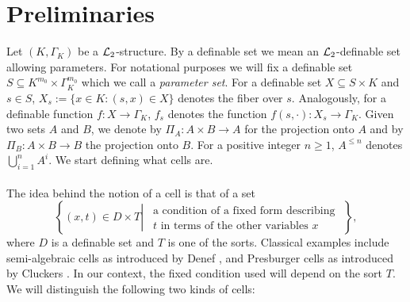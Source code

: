 \section{Preliminaries} \label{sec:celdec}

Let $(K,\Gamma_K)$ be a ${\mathcal L}_2$-structure. By a definable set we mean an $\mathcal{L}_2$-definable set allowing parameters. For notational purposes we will fix a definable set $S \subseteq K^{m_0} \times \Gamma_K^{m_0}$ which we call a \emph{parameter set}. For a definable set $X\subseteq S\times K$ and $s\in S$, $X_s:=\{x\in K: (s,x)\in X\}$ denotes the fiber over $s$. Analogously, for a definable function $f:X\rightarrow \Gamma_K$, $f_s$ denotes the function $f(s,\cdot):X_s\rightarrow \Gamma_K$. Given two sets $A$ and $B$, we denote by $\Pi_{A}:A\times B\to A$ for the projection onto $A$ and by $\Pi_B:A\times B\to B$ the projection onto $B$. For a positive integer $n\geq 1$, $A^{\leq n}$ denotes $\bigcup_{i=1}^n A^i$. We start defining what cells are.
\\\\
The idea behind the notion of a cell is that of a set %
\[\left\{(x,t) \in D \times T \left| \ \ \begin{array}{l} \text{a condition of a fixed form describing } \\ t \text{ in terms of the other variables } x \end{array}  \right\}\right.,\]
where $D$ is a definable set and $T$ is one of the sorts. Classical examples include semi-algebraic cells as introduced by Denef \cite{denef-86}, and Presburger cells as introduced by Cluckers \cite{clu-presb03}. In our context, the fixed condition used will depend on the sort $T$. We will distinguish the following two kinds of cells:

